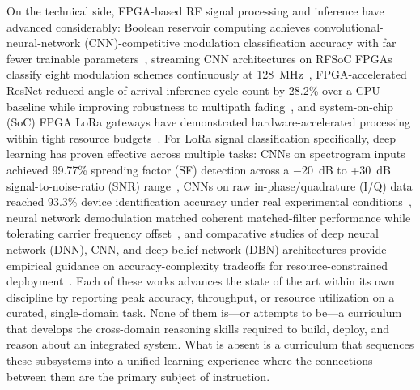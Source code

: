 \documentclass[conference]{IEEEtran}
\begin{document}
On the technical side, FPGA-based RF signal processing and inference have advanced considerably: Boolean reservoir computing achieves convolutional-neural-network (CNN)-competitive modulation classification accuracy with far fewer trainable parameters~\cite{b1}, streaming CNN architectures on RFSoC FPGAs classify eight modulation schemes continuously at 128~MHz~\cite{b3}, FPGA-accelerated ResNet reduced angle-of-arrival inference cycle count by 28.2\% over a CPU baseline while improving robustness to multipath fading~\cite{b2}, and system-on-chip (SoC) FPGA LoRa gateways have demonstrated hardware-accelerated processing within tight resource budgets~\cite{b7}. For LoRa signal classification specifically, deep learning has proven effective across multiple tasks: CNNs on spectrogram inputs achieved 99.77\% spreading factor (SF) detection across a $-$20~dB to +30~dB signal-to-noise-ratio (SNR) range~\cite{b5}, CNNs on raw in-phase/quadrature (I/Q) data reached 93.3\% device identification accuracy under real experimental conditions~\cite{b6}, neural network demodulation matched coherent matched-filter performance while tolerating carrier frequency offset~\cite{b8}, and comparative studies of deep neural network (DNN), CNN, and deep belief network (DBN) architectures provide empirical guidance on accuracy-complexity tradeoffs for resource-constrained deployment~\cite{b4}. Each of these works advances the state of the art within its own discipline by reporting peak accuracy, throughput, or resource utilization on a curated, single-domain task. None of them is---or attempts to be---a curriculum that develops the cross-domain reasoning skills required to build, deploy, and reason about an integrated system. What is absent is a curriculum that sequences these subsystems into a unified learning experience where the connections between them are the primary subject of instruction.
\end{document}
